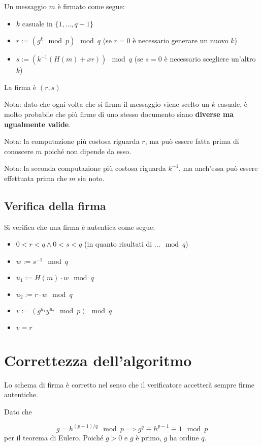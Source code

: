 \documentclass[14pt]{extarticle}
\begin{document}
    Un messaggio $m$ è firmato come segue:
    \begin{itemize}
        \item $k$ casuale in $\{1, ..., q-1\}$
        \item $r := (g^k \mod p) \mod q$ (se $r = 0$ è necessario generare un nuovo $k$)
        \item $s := (k^{-1}(H(m) + xr)) \mod q$ (se $s = 0$ è necessario scegliere un'altro $k$)
    \end{itemize}
    La firma è $(r, s)$

    \bigskip
    Nota: dato che ogni volta che si firma il messaggio viene scelto un $k$ casuale, è molto probabile che più firme di uno stesso documento siano \textbf{diverse ma ugualmente valide}.

    \bigskip
    Nota: la computazione più costosa riguarda $r$, ma può essere fatta prima di conoscere $m$ poiché non dipende da esso.

    \bigskip
    Nota: la seconda computazione più costosa riguarda $k^{-1}$, ma anch'essa può essere effettuata prima che $m$ sia noto.

    \subsection{Verifica della firma}

    Si verifica che una firma è autentica come segue:
    \begin{itemize}
        \item $0 < r < q \wedge 0 < s < q$ (in quanto risultati di $... \mod q$)
        \item $w := s^{-1} \mod q$
        \item $u_1 := H(m) \cdot w \mod q$
        \item $u_2 := r \cdot w \mod q$
        \item $v := (g^{u_1}y^{u_2} \mod p) \mod q$
        \item $v = r$
    \end{itemize}

    \section{Correttezza dell'algoritmo}

    Lo schema di firma è corretto nel senso che il verificatore accetterà sempre firme autentiche.

    \bigskip
    Dato che
    
    \begin{equation*}
        g = h^{(p-1)/q} \mod p
        \implies
        g^q \equiv h^{p-1} \equiv 1 \mod p
    \end{equation*}
    per il teorema di Eulero.
    Poiché $g > 0$ e $g$ è primo, $g$ ha ordine $q$.
\end{document}
